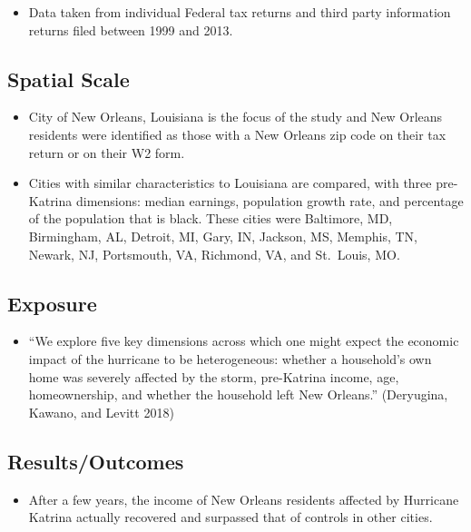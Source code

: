 \documentclass[
]{article}
\providecommand{\tightlist}{%
  \setlength{\itemsep}{0pt}\setlength{\parskip}{0pt}}
\begin{document}
\begin{itemize}
\tightlist
\item
  Data taken from individual Federal tax returns and third party
  information returns filed between 1999 and 2013.
\end{itemize}

\hypertarget{spatial-scale-28}{%
\subsection{Spatial Scale}\label{spatial-scale-28}}

\begin{itemize}
\tightlist
\item
  City of New Orleans, Louisiana is the focus of the study and New
  Orleans residents were identified as those with a New Orleans zip code
  on their tax return or on their W2 form.
\item
  Cities with similar characteristics to Louisiana are compared, with
  three pre-Katrina dimensions: median earnings, population growth rate,
  and percentage of the population that is black. These cities were
  Baltimore, MD, Birmingham, AL, Detroit, MI, Gary, IN, Jackson, MS,
  Memphis, TN, Newark, NJ, Portsmouth, VA, Richmond, VA, and St.~Louis,
  MO.
\end{itemize}

\hypertarget{exposure-27}{%
\subsection{Exposure}\label{exposure-27}}

\begin{itemize}
\tightlist
\item
  ``We explore five key dimensions across which one might expect the
  economic impact of the hurricane to be heterogeneous: whether a
  household's own home was severely affected by the storm, pre-Katrina
  income, age, homeownership, and whether the household left New
  Orleans.'' (Deryugina, Kawano, and Levitt 2018)
\end{itemize}

\hypertarget{resultsoutcomes-17}{%
\subsection{Results/Outcomes}\label{resultsoutcomes-17}}

\begin{itemize}
\tightlist
\item
  After a few years, the income of New Orleans residents affected by
  Hurricane Katrina actually recovered and surpassed that of controls in
  other cities.
\end{itemize}
\end{document}
